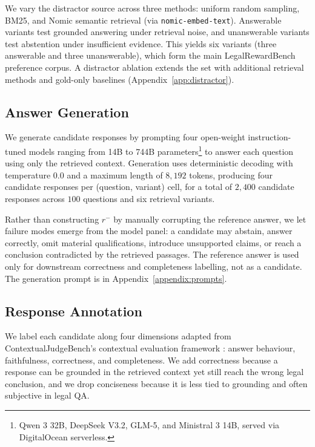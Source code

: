 \documentclass{article}
\theoremstyle{plain}
\theoremstyle{definition}
\theoremstyle{remark}
\begin{document}
We vary the distractor source across three methods: uniform random sampling, BM25, and Nomic semantic retrieval (via \texttt{nomic-embed-text}). Answerable variants test grounded answering under retrieval noise, and unanswerable variants test abstention under insufficient evidence. This yields six variants (three answerable and three unanswerable), which form the main LegalRewardBench preference corpus. A distractor ablation extends the set with additional retrieval methods and gold-only baselines (Appendix~\ref{app:distractor}).

\subsection{Answer Generation}
\label{sec:candidate-response-generation}

We generate candidate responses by prompting four open-weight instruction-tuned models ranging from 14B to 744B parameters\footnote{Qwen 3 32B, DeepSeek V3.2, GLM-5, and Ministral 3 14B, served via DigitalOcean serverless.} to answer each question using only the retrieved context. Generation uses deterministic decoding with temperature $0.0$ and a maximum length of $8{,}192$ tokens, producing four candidate responses per (question, variant) cell, for a total of $2{,}400$ candidate responses across $100$ questions and six retrieval variants.

Rather than constructing $r^{-}$ by manually corrupting the reference answer, we let failure modes emerge from the model panel: a candidate may abstain, answer correctly, omit material qualifications, introduce unsupported claims, or reach a conclusion contradicted by the retrieved passages. The reference answer is used only for downstream correctness and completeness labelling, not as a candidate. The generation prompt is in Appendix~\ref{appendix:prompts}.

\subsection{Response Annotation}
\label{sec:response-annotation}

We label each candidate along four dimensions adapted from ContextualJudgeBench's contextual evaluation framework \citep{xu-etal-2025-context}: answer behaviour, faithfulness, correctness, and completeness. We add correctness because a response can be grounded in the retrieved context yet still reach the wrong legal conclusion, and we drop conciseness because it is less tied to grounding and often subjective in legal QA.
\end{document}
